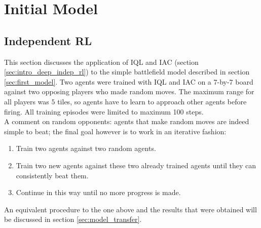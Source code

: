 \section{Initial Model}
\subsection{Independent RL}
\label{sec:init_model_iql}
This section discusses the application of IQL and IAC (section \ref{sec:intro_deep_indep_rl}) to the simple battlefield model described in section \ref{sec:first_model}. Two agents were trained with IQL and IAC on a 7-by-7 board against two opposing players who made random moves. The maximum range for all players was $5$ tiles, so agents have to learn to approach other agents before firing. All training episodes were limited to maximum 100 steps.\\
A comment on random opponents: agents that make random moves are indeed simple to beat; the final goal however is to work in an iterative fashion: 
\begin{enumerate}
    \item Train two agents against two random agents.
    \item Train two new agents against these two already trained agents until they can consistently beat them.
    \item Continue in this way until no more progress is made.
\end{enumerate}
An equivalent procedure to the one above and the results that were obtained will be discussed in section \ref{sec:model_transfer}.

